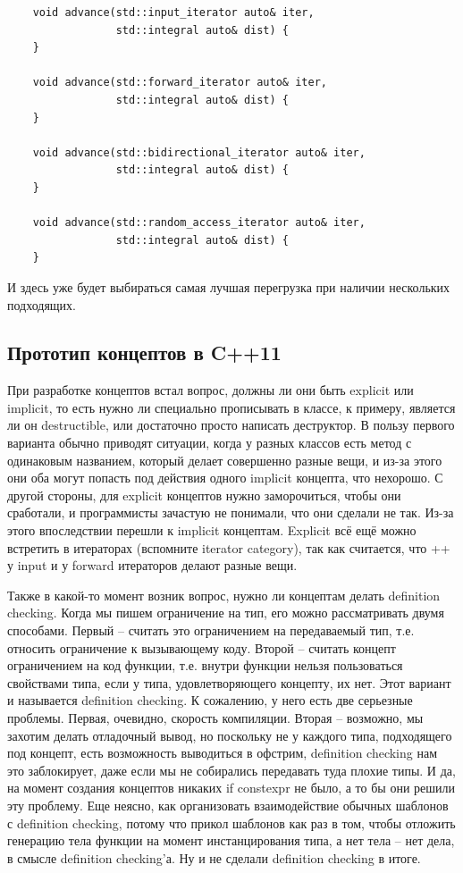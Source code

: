 \documentclass[12pt, a4paper]{article}
\begin{document}
\begin{verbatim}
	void advance(std::input_iterator auto& iter, 
				 std::integral auto& dist) {
	}
	
	void advance(std::forward_iterator auto& iter, 
			     std::integral auto& dist) { 
	}
	
	void advance(std::bidirectional_iterator auto& iter, 
				 std::integral auto& dist) { 
	}
	
	void advance(std::random_access_iterator auto& iter, 
				 std::integral auto& dist) { 
	}
\end{verbatim}
И здесь уже будет выбираться самая лучшая перегрузка при наличии нескольких подходящих.
\subsection{Прототип концептов в C++11}
При разработке концептов встал вопрос, должны ли они быть explicit или implicit, то есть нужно ли специально прописывать в классе, к примеру, является ли он destructible, или достаточно просто написать деструктор. В пользу первого варианта обычно приводят ситуации, когда у разных классов есть метод с одинаковым названием, который делает совершенно разные вещи, и из-за этого они оба могут попасть под действия одного implicit концепта, что нехорошо. С другой стороны, для explicit концептов нужно заморочиться, чтобы они сработали, и программисты зачастую не понимали, что они сделали не так. Из-за этого впоследствии перешли к implicit концептам. Explicit всё ещё можно встретить в итераторах (вспомните iterator category), так как считается, что ++ у input и у forward итераторов делают разные вещи.
\par Также в какой-то момент возник вопрос, нужно ли концептам делать definition checking. Когда мы пишем ограничение на тип, его можно рассматривать двумя способами. Первый -- считать это ограничением на передаваемый тип, т.е. относить ограничение к вызывающему коду. Второй -- считать концепт ограничением на код функции, т.е. внутри функции нельзя пользоваться свойствами типа, если у типа, удовлетворяющего концепту, их нет. Этот вариант и называется definition checking. К сожалению, у него есть две серьезные проблемы. Первая, очевидно, скорость компиляции. Вторая -- возможно, мы захотим делать отладочный вывод, но поскольку не у каждого типа, подходящего под концепт, есть возможность выводиться в офстрим, definition checking нам это заблокирует, даже если мы не собирались передавать туда плохие типы. И да, на момент создания концептов никаких if constexpr не было, а то бы они решили эту проблему. Еще неясно, как организовать взаимодействие обычных шаблонов с definition checking, потому что прикол шаблонов как раз в том, чтобы отложить генерацию тела функции на момент инстанцирования типа, а нет тела -- нет дела, в смысле definition checking'а. Ну и не сделали definition checking в итоге.
\end{document}
